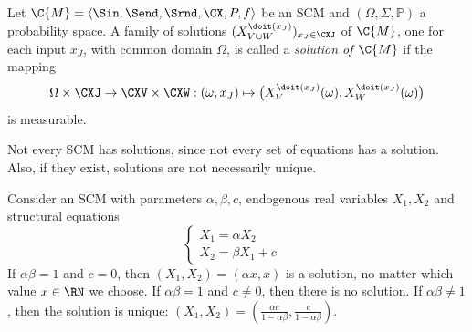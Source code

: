 \begin{Def}\label{def:scm_solutions}
  Let $\C{M} = \langle \Sin, \Send, \Srnd, \CX, P, f \rangle$ be an SCM
  and $(\Omega,\Sigma,\mathbb{P})$ a probability space.
  A family of solutions $(X_{V\cup W}^{\doit(x_J)})_{x_J\in\CXJ}$ of $\C{M}$, one for each input $x_J$,
  with common domain $\Omega$, is called a \emph{solution of $\C{M}$} if 
  the mapping
      $$\Omega \times \CXJ \to \CXV \times \CXW : (\omega, x_J) \mapsto \big(X_V^{\doit(x_J)}(\omega),X_W^{\doit(x_J)}(\omega)\big)$$
  is measurable.
\end{Def}
Not every SCM has solutions, since not every set of equations has a solution. Also, if they exist,
solutions are not necessarily unique.
\begin{Eg}
Consider an SCM with parameters $\alpha,\beta,c$, endogenous real variables $X_1,X_2$ and structural equations
$$\begin{cases}
  X_1 = \alpha X_2 & \\
  X_2 = \beta X_1 + c &
\end{cases}$$
If $\alpha \beta = 1$ and $c = 0$, then $(X_1,X_2) = (\alpha x,x)$ is a solution, no matter which value $x\in\RN$ we choose. 
If $\alpha \beta = 1$ and $c \ne 0$, then there is no solution. 
If $\alpha \beta \ne 1$, then the solution is unique: $(X_1,X_2) = (\frac{\alpha c}{1 - \alpha\beta},\frac{c}{1 - \alpha\beta})$.
\end{Eg}

